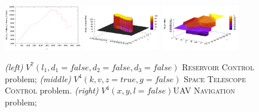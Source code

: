 ﻿%
\begin{figure}[tbp!]
\centering
\includegraphics[width=0.30\textwidth]{Figures/reserV7.pdf}
\includegraphics[width=0.30\textwidth]{Figures/telesV4.pdf}
\includegraphics[width=0.30\textwidth]{Figures/uavV4.pdf}
\vspace{-2mm}
\caption{\footnotesize
{\it (left)}  $V^7(l_1,d_1=false,d_2=false,d_3=false)$ \textsc{Reservoir Control} problem;
{\it (middle)} $V^4(k,v,z=true,g=false)$ \textsc{Space Telescope Control} problem.
{\it (right)}  $V^4(x,y,l=false)$\textsc{UAV Navigation} problem;
}
\label{fig:Value}
\vspace{-5mm}
\end{figure}


